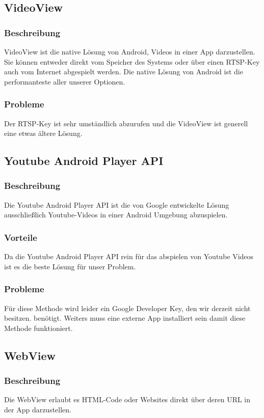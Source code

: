 \documentclass[FIPLY_base.tex]{subfiles}
\begin{document}
\subsection{VideoView}
\subsubsection{Beschreibung}
VideoView ist die native Lösung von Android, Videos in einer App darzustellen. Sie können entweder direkt vom Speicher des Systems oder über einen RTSP-Key auch vom Internet  abgespielt werden.
Die native Lösung von Android ist die performanteste aller unserer Optionen.
\subsubsection{Probleme}
Der RTSP-Key ist sehr umständlich abzurufen und die VideoView ist generell eine etwas ältere Lösung.

\subsection{Youtube Android Player API}
\subsubsection{Beschreibung}
Die Youtube Android Player API ist die von Google entwickelte Lösung ausschließlich Youtube-Videos in einer Android Umgebung abzuspielen.
\subsubsection{Vorteile}
Da die Youtube Android Player API rein für das abspielen von Youtube Videos ist es die beste Lösung für unser Problem.
\subsubsection{Probleme}
Für diese Methode wird leider ein Google Developer Key, den wir derzeit nicht besitzen. benötigt. Weiters muss eine externe App installiert sein damit diese Methode funktioniert.
\newpage

\subsection{WebView}
\subsubsection{Beschreibung}
Die WebView erlaubt es HTML-Code oder Websites direkt über deren URL in der App darzustellen.
\end{document}
